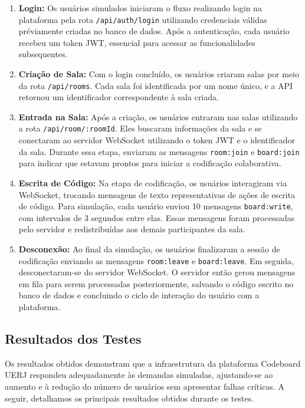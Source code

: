\begin{enumerate}
    \item \textbf{Login:} Os usuários simulados iniciaram o fluxo realizando login na plataforma pela rota \texttt{/api/auth/login} utilizando credenciais válidas préviamente criadas no banco de dados. Após a autenticação, cada usuário recebeu um token JWT, essencial para acessar as funcionalidades subsequentes.
    \item \textbf{Criação de Sala:} Com o login concluído, os usuários criaram salas por meio da rota \texttt{/api/rooms}. Cada sala foi identificada por um nome único, e a API retornou um identificador correspondente à sala criada.
    \item \textbf{Entrada na Sala:} Após a criação, os usuários entraram nas salas utilizando a rota \texttt{/api/room/:roomId}. Eles buscaram informações da sala e se conectaram ao servidor WebSocket utilizando o token JWT e o identificador da sala. Durante essa etapa, enviaram as mensagens \texttt{room:join} e \texttt{board:join} para indicar que estavam prontos para iniciar a codificação colaborativa.
    \item \textbf{Escrita de Código:} Na etapa de codificação, os usuários interagiram via WebSocket, trocando mensagens de texto representativas de ações de escrita de código. Para simulação, cada usuário enviou 10 mensagens \texttt{board:write}, com intervalos de 3 segundos entre elas. Essas mensagens foram processadas pelo servidor e redistribuídas aos demais participantes da sala.
    \item \textbf{Desconexão:} Ao final da simulação, os usuários finalizaram a sessão de codificação enviando as mensagens \texttt{room:leave} e \texttt{board:leave}. Em seguida, desconectaram-se do servidor WebSocket. O servidor então gerou mensagens em fila para serem processadas posteriormente, salvando o código escrito no banco de dados e concluindo o ciclo de interação do usuário com a plataforma.
\end{enumerate}


\subsection{Resultados dos Testes}

Os resultados obtidos demonstram que a infraestrutura da plataforma Codeboard UERJ respondeu adequadamente às demandas simuladas, ajustando-se ao aumento e à redução do número de usuários sem apresentar falhas críticas. A seguir, detalhamos os principais resultados obtidos durante os testes.

